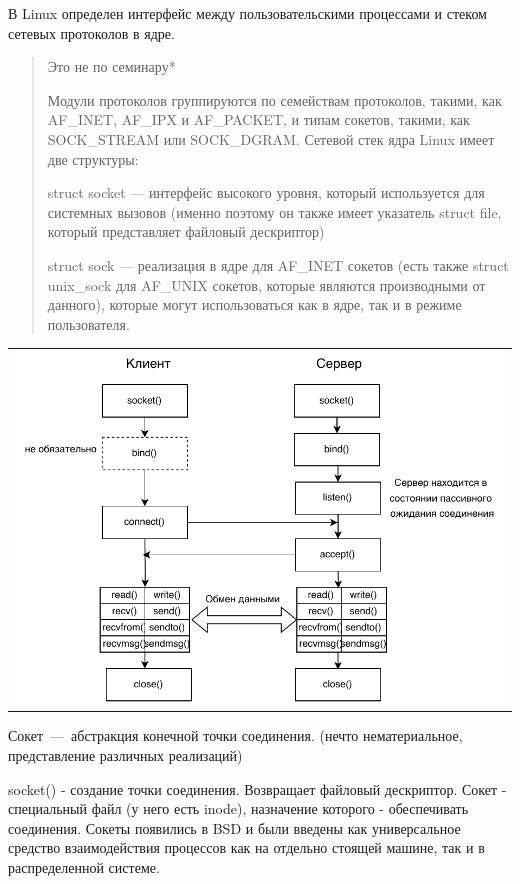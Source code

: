 В Linux определен интерфейс между пользовательскими процессами и стеком сетевых протоколов в ядре.

\begin{quote}
Это не по семинару*

Модули протоколов группируются по семействам протоколов, такими, как AF\_INET, AF\_IPX и AF\_PACKET, и типам сокетов, такими, как SOCK\_STREAM или SOCK\_DGRAM. Сетевой стек ядра Linux имеет две структуры:

struct socket — интерфейс высокого уровня, который используется для системных вызовов (именно поэтому он также имеет указатель struct file, который представляет файловый дескриптор)

struct sock — реализация в ядре для AF\_INET сокетов (есть также struct unix\_sock для AF\_UNIX сокетов, которые являются производными от данного), которые могут использоваться как в ядре, так и в режиме пользователя.
\end{quote}

\begin{table}[H]
  \centering
  \begin{tabular}{p{1\linewidth}}
    \centering
    \includegraphics[width=0.8\linewidth]{./images/4.pdf}
  \end{tabular}
\end{table}

Сокет~---~абстракция конечной точки соединения. (нечто нематериальное, представление различных реализаций)

socket() - создание точки соединения. Возвращает файловый дескриптор. Сокет - специальный файл (у него есть inode), назначение которого - обеспечивать соединения. Сокеты появились в BSD и были введены как универсальное средство взаимодействия процессов как на отдельно стоящей машине, так и в распределенной системе.

